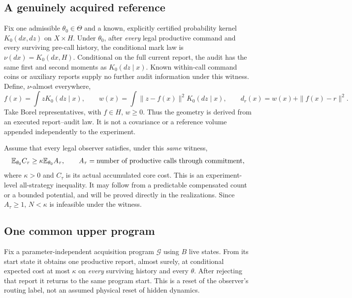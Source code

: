 \subsection*{A genuinely acquired reference}
Fix one admissible $\theta_0\in\Theta$ and a known, explicitly certified probability kernel $K_0(dx,dz)$ on $X\times H$. Under $\theta_0$, after \emph{every} legal productive command and every surviving pre-call history, the conditional mark law is $\nu(dx)=K_0(dx,H)$. Conditional on the full current report, the audit has the same first and second moments as $K_0(dz\mid x)$. Known within-call command coins or auxiliary reports supply no further audit information under this witness. Define, $\nu$-almost everywhere,
\begin{equation}\label{eq:derived}
 f(x)=\int zK_0(dz\mid x),\qquad
 w(x)=\int\|z-f(x)\|^2K_0(dz\mid x),\qquad
 d_r(x)=w(x)+\|f(x)-r\|^2.
\end{equation}
Take Borel representatives, with $f\in H$, $w\ge0$. Thus the geometry is derived from an executed report--audit law. It is not a covariance or a reference volume appended independently to the experiment.

Assume that every legal observer satisfies, under this \emph{same} witness,
\begin{equation}\label{eq:effort}
 \mathbb E_{\theta_0} C_\tau\ge\kappa\mathbb E_{\theta_0} A_\tau,
 \qquad A_\tau=\text{number of productive calls through commitment},
\end{equation}
where $\kappa>0$ and $C_\tau$ is its actual accumulated core cost. This is an experiment-level all-strategy inequality. It may follow from a predictable compensated count or a bounded potential, and will be proved directly in the realizations. Since $A_\tau\ge1$, $N<\kappa$ is infeasible under the witness.

\subsection*{One common upper program}
Fix a parameter-independent acquisition program $\mathcal G$ using $B$ live states. From its start state it obtains one productive report, almost surely, at conditional expected cost at most $\kappa$ on \emph{every} surviving history and every $\theta$. After rejecting that report it returns to the same program start. This is a reset of the observer's routing label, not an assumed physical reset of hidden dynamics.

